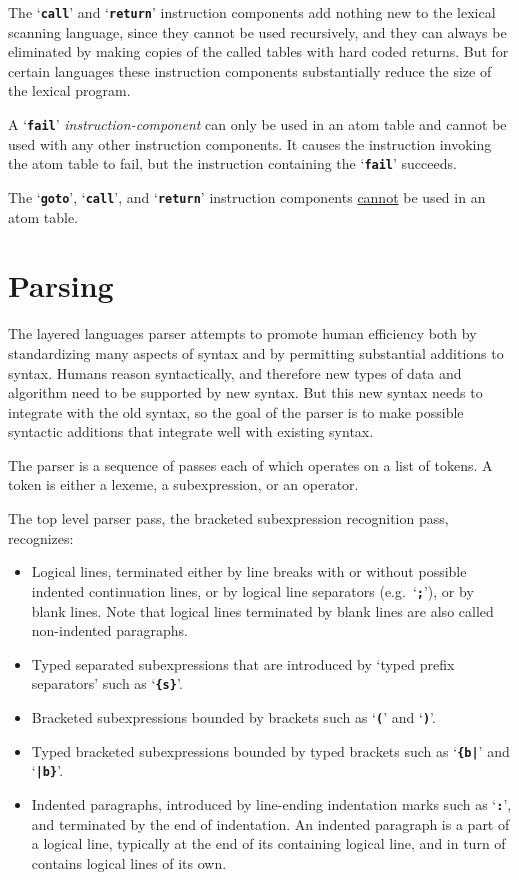 \documentclass[12pt]{article}
\makeatletter
\newcommand{\TT}[1]{{\tt \bfseries #1}}
\newcommand{\ttmkey}[2]{\TT{#1}\index{#1@{\tt #1}!#2}}
\makeatother
\begin{document}
The `\TT{call}' and `\TT{return}' instruction components
add nothing new to the lexical scanning language, since they
cannot be used recursively,
and they can always be eliminated by making
copies of the called tables with hard coded returns.
But for certain languages these instruction components
substantially reduce the size of the lexical program.

A `\ttmkey{fail}{in lexical program}'
{\em instruction-component} can only be used in an atom
table and cannot be used with any other instruction components.
It causes the instruction invoking the atom table to fail, but
the instruction containing the `\TT{fail}' succeeds.

The `\TT{goto}', `\TT{call}', and `\TT{return}' instruction components
\underline{cannot} be used in an atom table.

\section{Parsing}

The layered languages parser attempts to promote human efficiency
both by standardizing many aspects of syntax and by permitting
substantial additions to syntax.  Humans reason
syntactically, and therefore new types of data and algorithm
need to be supported by new syntax.  But this new syntax needs to
integrate with the old syntax, so the goal of the parser is to make
possible syntactic additions that integrate well with existing syntax.

The parser is a sequence of passes each of which operates on a list
of tokens.  A token is either a lexeme, a subexpression, or an operator.

The top level parser pass, the bracketed subexpression recognition pass,
recognizes:
\begin{itemize}
\item Logical lines, terminated either by line breaks with or without
possible indented continuation lines, or by logical line separators
(e.g.~`\TT{;}'), or by blank lines.  Note that logical
lines terminated by blank lines are also called non-indented paragraphs.
\item Typed separated subexpressions that are introduced by 
`typed prefix separators' such as
`\TT{\{s\}}'.
\item Bracketed subexpressions bounded by brackets
such as `\TT{(}' and `\TT{)}'.
\item Typed bracketed subexpressions bounded by typed brackets
such as `\TT{\{b|}' and `\TT{|b\}}'.
\item Indented paragraphs, introduced by line-ending
indentation marks such as `\TT{:}', and terminated by the end of indentation.
An indented paragraph is a part of a logical
line, typically at the end of its containing logical line,
and in turn of contains logical lines of its own.
\end{itemize}
\end{document}
